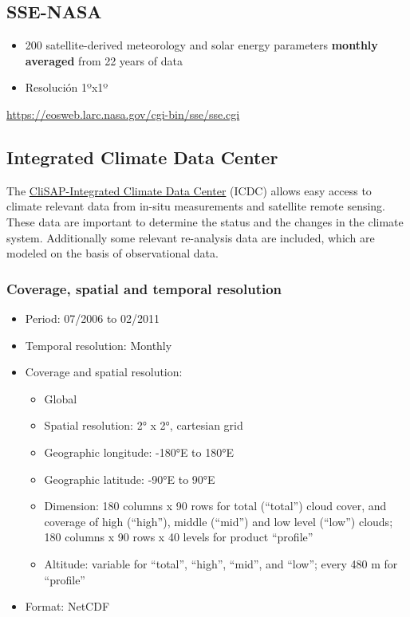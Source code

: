\documentclass[11pt]{article}
\begin{document}
\subsection{SSE-NASA}
\label{sec-1-2}
\begin{itemize}
\item 200 satellite-derived meteorology and solar energy parameters
  \textbf{monthly averaged} from 22 years of data
\item Resolución 1ºx1º
\end{itemize}

\url{https://eosweb.larc.nasa.gov/cgi-bin/sse/sse.cgi}

\subsection{Integrated Climate Data Center}
\label{sec-1-3}

The \href{http://icdc.zmaw.de/icdc_home.html?&L=1}{CliSAP-Integrated Climate Data Center} (ICDC) allows easy
access to climate relevant data from in-situ measurements and
satellite remote sensing. These data are important to determine
the status and the changes in the climate system. Additionally
some relevant re-analysis data are included, which are modeled on
the basis of observational data.

\subsubsection{Coverage, spatial and temporal resolution}
\label{sec-1-3-1}

\begin{itemize}
\item Period: 07/2006 to 02/2011
\item Temporal resolution: Monthly

\item Coverage and spatial resolution:

\begin{itemize}
\item Global
\item Spatial resolution: 2° x 2°, cartesian grid
\item Geographic longitude: -180°E to 180°E
\item Geographic latitude: -90°E to 90°E
\item Dimension: 180 columns x 90 rows for total (``total'') cloud cover, and coverage of high (``high''), middle (``mid'') and low level (``low'') clouds; 180 columns x 90 rows x 40 levels for product ``profile''
\item Altitude: variable for ``total'', ``high'', ``mid'', and ``low''; every 480 m for ``profile''
\end{itemize}

\item Format: NetCDF
\end{itemize}
\end{document}
